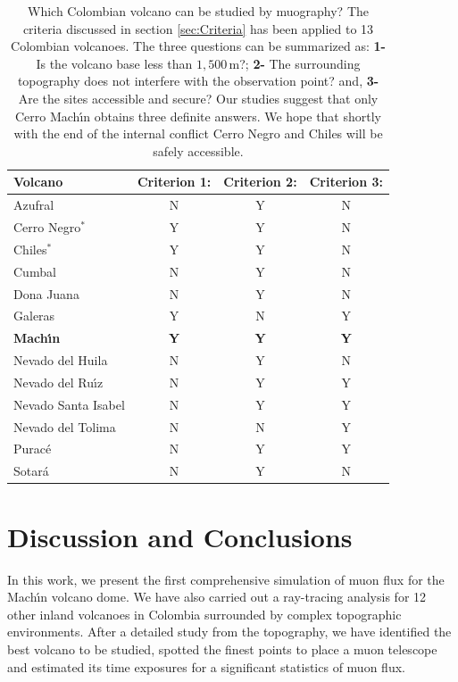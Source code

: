 \documentclass[letterpaper,10pt,titlepage,linenumber]{article}
\begin{document}
\begin{table}[ht!]
  \centering 
\begin{tabular}{|l|c|c|c|} \hline
 Volcano                & \textbf{Criterion 1:} & \textbf{Criterion 2:} & \textbf{Criterion 3:} \\ \hline 
{Azufral}               & N  					& Y 				    & N				        \\
{Cerro Negro$^{*}$}     & Y						& Y     			    & N 				    \\
{Chiles$^{*}$}  	    & Y						& Y    			        & N  				    \\
{Cumbal}  			    & N 					& Y  				    & N				        \\
{Dona Juana}		    & N 					& Y    			        & N				        \\ 
{Galeras}  		        & Y 					& N     			    & Y 				    \\
\textbf{Mach\'{\i}n}  	    & {\textbf{Y}} 			& {\textbf{Y}}		    & {\textbf{Y}}		    \\
{Nevado del Huila}      & N						& Y    			        & N				        \\
{Nevado del Ru\'{\i}z} 	& N 					& Y    			        & Y				        \\
{Nevado Santa Isabel}   & N 					& Y    			        & Y				        \\
{Nevado del Tolima}     & N 					& N    			        & Y				        \\
{Purac\'e}  		    & N 					& Y 				    & Y				        \\
{Sotar\'a}  			& N 					& Y  				    & N				        \\
\hline
\end{tabular}
  \caption{Which Colombian volcano can be studied by muography? The criteria discussed in section \ref{sec:Criteria} has been applied to 13 Colombian volcanoes. The three questions can be summarized as: \textbf{1-} Is the volcano base less than  $1,500$\,m?; \textbf{2-} The surrounding topography does not interfere with the observation point? and, \textbf{3-} Are the sites accessible and secure? Our studies suggest that only Cerro Mach\'{\i}n obtains three definite answers. We hope that shortly with the end of the internal conflict Cerro Negro and Chiles will be safely accessible.}
  \label{TableCriteria}
\end{table}


\section{Discussion and Conclusions}
\label{sec:disc}
In this work, we present the first comprehensive simulation of muon flux for the Mach\'{\i}n volcano dome. We have also carried out a ray-tracing analysis for 12 other inland volcanoes in Colombia surrounded by complex topographic environments. After a detailed study from the topography, we have identified the best volcano to be studied, spotted the finest points to place a muon telescope and estimated its time exposures for a significant statistics of muon flux. 
\end{document}
